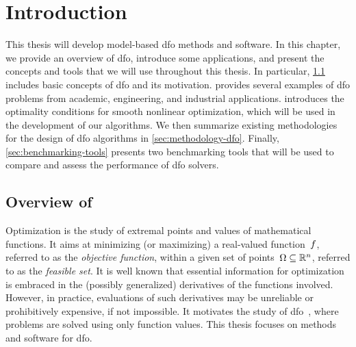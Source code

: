%
%
%
\chapter{Introduction}
\label{ch:introduction}

This thesis will develop model-based \gls{dfo} methods and software.
In this chapter, we provide an overview of \gls{dfo}, introduce some applications, and present the concepts and tools that we will use throughout this thesis.
In particular, \cref{sec:overview} includes basic concepts of \gls{dfo} and its motivation.
 provides several examples of \gls{dfo} problems from academic, engineering, and industrial applications.
 introduces the optimality conditions for smooth nonlinear optimization, which will be used in the development of our algorithms.
We then summarize existing methodologies for the design of \gls{dfo} algorithms in \cref{sec:methodology-dfo}.
Finally, \cref{sec:benchmarking-tools} presents two benchmarking tools that will be used to compare and assess the performance of \gls{dfo} solvers.

\section{Overview of }
\label{sec:overview}

Optimization is the study of extremal points and values of mathematical functions.
It aims at minimizing (or maximizing) a real-valued function~$f$, referred to as the \emph{objective function}, within a given set of points~$\Omega \subseteq \mathbb{R}^n$, referred to as the \emph{feasible set}.
It is well known that essential information for optimization is embraced in the (possibly generalized) derivatives of the functions involved.
However, in practice, evaluations of such derivatives may be unreliable or prohibitively expensive, if not impossible.
It motivates the study of \gls{dfo}~\cite{Conn_Scheinberg_Vicente_2009b,Audet_Hare_2017,Custodio_Scheinberg_Vicente_2017,Larson_Menickelly_Wild_2019}, where problems are solved using only function values.
This thesis focuses on methods and software for \gls{dfo}.

